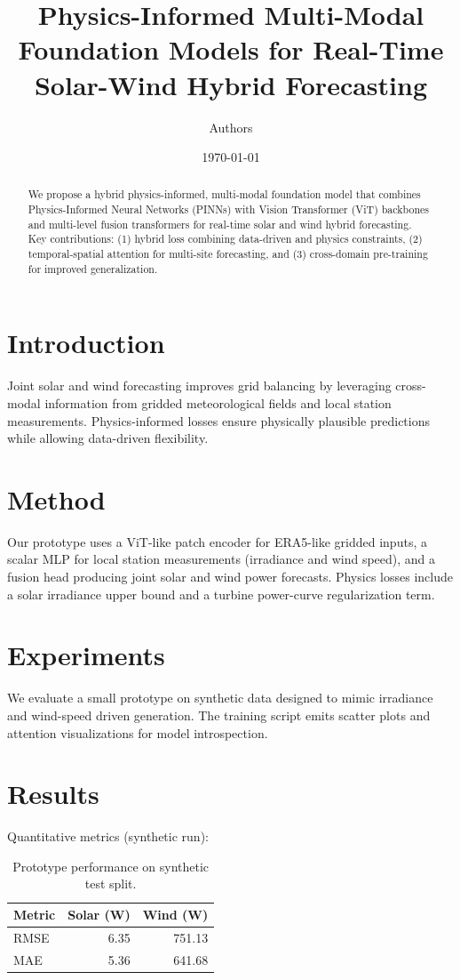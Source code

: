 \documentclass[11pt]{article}
\title{Physics-Informed Multi-Modal Foundation Models for Real-Time Solar-Wind Hybrid Forecasting}
\author{Authors}
\date{\today}
\begin{document}
\maketitle
\begin{abstract}
We propose a hybrid physics-informed, multi-modal foundation model that combines Physics-Informed Neural Networks (PINNs) with Vision Transformer (ViT) backbones and multi-level fusion transformers for real-time solar and wind hybrid forecasting. Key contributions: (1) hybrid loss combining data-driven and physics constraints, (2) temporal-spatial attention for multi-site forecasting, and (3) cross-domain pre-training for improved generalization.
\end{abstract}

\section{Introduction}
Joint solar and wind forecasting improves grid balancing by leveraging cross-modal information from gridded meteorological fields and local station measurements. Physics-informed losses ensure physically plausible predictions while allowing data-driven flexibility.

\section{Method}
Our prototype uses a ViT-like patch encoder for ERA5-like gridded inputs, a scalar MLP for local station measurements (irradiance and wind speed), and a fusion head producing joint solar and wind power forecasts. Physics losses include a solar irradiance upper bound and a turbine power-curve regularization term.

\section{Experiments}
We evaluate a small prototype on synthetic data designed to mimic irradiance and wind-speed driven generation. The training script emits scatter plots and attention visualizations for model introspection.

\section{Results}
Quantitative metrics (synthetic run):
\begin{table}[h]
\centering
\begin{tabular}{lrr}
\toprule
Metric & Solar (W) & Wind (W) \\
\midrule
RMSE & 6.35 & 751.13 \\
MAE  & 5.36 & 641.68 \\
\bottomrule
\end{tabular}
\caption{Prototype performance on synthetic test split.}
\end{table}
\end{document}
